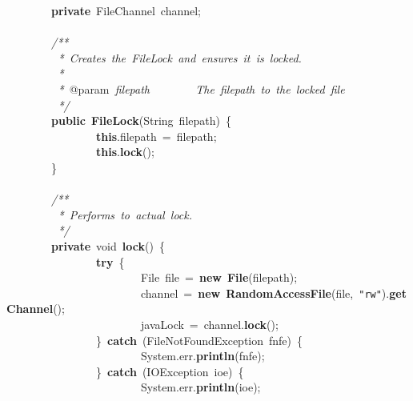 \mbox{}\ \ \ \ \ \ \ \ \textbf{private}\ FileChannel\ channel; \\
\mbox{} \\
\mbox{}\ \ \ \ \ \ \ \ \textit{/**} \\
\mbox{}\textit{\ \ \ \ \ \ \ \ \ *\ Creates\ the\ FileLock\ and\ ensures\ it\ is\ locked.} \\
\mbox{}\textit{\ \ \ \ \ \ \ \ \ *} \\
\mbox{}\textit{\ \ \ \ \ \ \ \ \ *\ }@param\textit{\ filepath\ \ \ \ \ \ \ \ The\ filepath\ to\ the\ locked\ file} \\
\mbox{}\textit{\ \ \ \ \ \ \ \ \ */} \\
\mbox{}\ \ \ \ \ \ \ \ \textbf{public}\ \textbf{FileLock}(String\ filepath)\ \{ \\
\mbox{}\ \ \ \ \ \ \ \ \ \ \ \ \ \ \ \ \textbf{this}.filepath\ =\ filepath; \\
\mbox{}\ \ \ \ \ \ \ \ \ \ \ \ \ \ \ \ \textbf{this}.\textbf{lock}(); \\
\mbox{}\ \ \ \ \ \ \ \ \} \\
\mbox{} \\
\mbox{}\ \ \ \ \ \ \ \ \textit{/**} \\
\mbox{}\textit{\ \ \ \ \ \ \ \ \ *\ Performs\ to\ actual\ lock.} \\
\mbox{}\textit{\ \ \ \ \ \ \ \ \ */} \\
\mbox{}\ \ \ \ \ \ \ \ \textbf{private}\ void\ \textbf{lock}()\ \{ \\
\mbox{}\ \ \ \ \ \ \ \ \ \ \ \ \ \ \ \ \textbf{try}\ \{ \\
\mbox{}\ \ \ \ \ \ \ \ \ \ \ \ \ \ \ \ \ \ \ \ \ \ \ \ File\ file\ =\ \textbf{new}\ \textbf{File}(filepath); \\
\mbox{}\ \ \ \ \ \ \ \ \ \ \ \ \ \ \ \ \ \ \ \ \ \ \ \ channel\ =\ \textbf{new}\ \textbf{RandomAccessFile}(file,\ \texttt{"{}rw"{}}).\textbf{getChannel}(); \\
\mbox{}\ \ \ \ \ \ \ \ \ \ \ \ \ \ \ \ \ \ \ \ \ \ \ \ javaLock\ =\ channel.\textbf{lock}(); \\
\mbox{}\ \ \ \ \ \ \ \ \ \ \ \ \ \ \ \ \}\ \textbf{catch}\ (FileNotFoundException\ fnfe)\ \{ \\
\mbox{}\ \ \ \ \ \ \ \ \ \ \ \ \ \ \ \ \ \ \ \ \ \ \ \ System.err.\textbf{println}(fnfe); \\
\mbox{}\ \ \ \ \ \ \ \ \ \ \ \ \ \ \ \ \}\ \textbf{catch}\ (IOException\ ioe)\ \{ \\
\mbox{}\ \ \ \ \ \ \ \ \ \ \ \ \ \ \ \ \ \ \ \ \ \ \ \ System.err.\textbf{println}(ioe); \\
